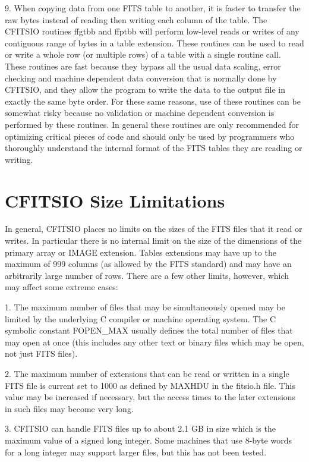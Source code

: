 9. When copying data from one FITS table to another, it is faster to
transfer the raw bytes instead of reading then writing each column of
the table.  The CFITSIO routines ffgtbb and ffptbb will perform
low-level reads or writes of any contiguous range of bytes in a table
extension.  These routines can be used to read or write a whole row (or
multiple rows) of a table with a single routine call.   These routines
are fast because they bypass all the usual data scaling, error checking
and machine dependent data conversion that is normally done by CFITSIO,
and they allow the program to write the data to the output file in
exactly the same byte order.  For these same reasons, use of these
routines can be somewhat risky because no validation or machine
dependent conversion is performed by these routines.  In general these
routines are only recommended for optimizing critical pieces of code
and should only be used by programmers who thoroughly understand the
internal format of the FITS tables they are reading or writing.


\section{CFITSIO Size Limitations}

In general, CFITSIO places no limits on the sizes of the FITS files that
it read or writes. In particular there is no internal limit on the size of the
dimensions of the primary array or IMAGE extension. Tables extensions may have
up to the maximum of 999 columns (as allowed by the FITS standard) and
may have an arbitrarily large number of rows. There are a few other limits,
however, which may affect some extreme cases:

1.  The maximum number of files that may be simultaneously opened may
be limited by the underlying C compiler or machine operating system.
The C symbolic constant FOPEN\_MAX usually defines the total number of
files that may open at once (this includes any other text or binary
files which may be open, not just FITS files).

2.  The maximum number of extensions that can be read or written in a
single FITS file is current set to 1000 as defined by MAXHDU in the
fitsio.h file.  This value may be increased if necessary, but the
access times to the later extensions in such files may become very
long.

3.  CFITSIO can handle FITS files up to about 2.1 GB in size which is
the maximum value of a signed long integer.  Some machines that use
8-byte words for a long integer may support larger files, but this has
not been tested.

